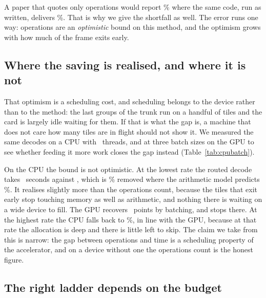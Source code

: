\documentclass[10pt,twocolumn,letterpaper]{article}
\newcommand{\dB}{\,dB}
\begin{document}
A paper that quotes only operations would report \WallPredicted\% where the same
code, run as written, delivers \WallSorted\%. That is why we give the shortfall
as well. The error runs one way: operations are an \emph{optimistic} bound on
this method, and the optimism grows with how much of the frame exits early.

\subsection{Where the saving is realised, and where it is not}

That optimism is a scheduling cost, and scheduling belongs to the device rather
than to the method: the last groups of the trunk run on a handful of tiles and
the card is largely idle waiting for them. If that is what the gap is, a machine
that does not care how many tiles are in flight should not show it. We measured
the same decodes on a CPU with \CpuThreads\ threads, and at three batch sizes on
the GPU to see whether feeding it more work closes the gap instead
(Table~\ref{tab:cpubatch}).

\begin{table}[t]
\centering

\caption{\textbf{The same saving in three places.} Per cent removed at the
$0.1\dB$ budget on a padded 1080p frame: the arithmetic model, the GPU at two
batch sizes, and the CPU. Arithmetic is the same in every column; only the
machine changes.}
\label{tab:cpubatch}
\end{table}

On the CPU the bound is not optimistic. At the lowest rate the routed decode
takes \CpuMsRouted\ seconds against \CpuMsStock, which is \CpuSavingLow\%
removed where the arithmetic model predicts \CpuPredLow\%. It realises slightly
more than the operations count, because the tiles that exit early stop touching
memory as well as arithmetic, and nothing there is waiting on a wide device to
fill. The GPU recovers \BatchGainLow\ points by batching, and stops
there. At the highest rate the CPU falls back to \CpuSavingHigh\%, in line with
the GPU, because at that rate the allocation is deep and there is little left to
skip. The claim we take from this is narrow: the gap between operations and time
is a scheduling property of the accelerator, and on a device without one the
operations count is the honest figure.

\subsection{The right ladder depends on the budget}
\end{document}
